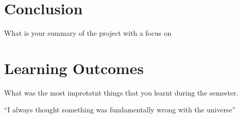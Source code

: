 \section{Conclusion}

What is your summary of the project with a focus on

\section{Learning Outcomes}

What was the most improtatnt things that you learnt during the semester.

``I always thought something was fundamentally wrong with the universe'' \citep{adams1995hitchhiker}
